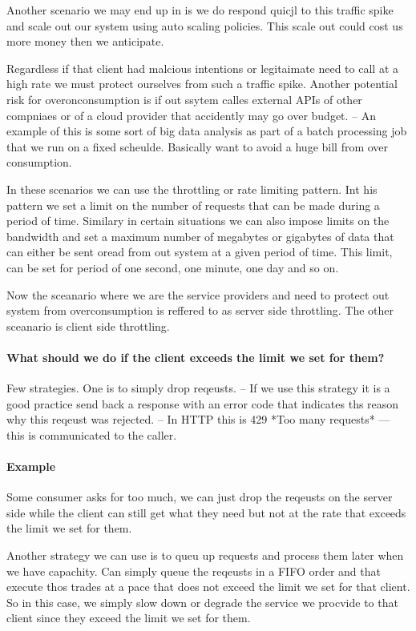 \documentclass[a4paper, 11pt]{book}
\begin{document}
    Another scenario we may end up in is we do respond quicjl to this traffic spike and scale out our system using auto scaling policies.
    This scale out could cost us more money then we anticipate.

    Regardless if that client had malcious intentions or legitaimate need to call at a high rate we must protect ourselves from such a traffic spike.
    Another potential risk for overonconsumption is if out ssytem calles external APIs of other compniaes or of a cloud provider that accidently may go over budget.
    -- An example of this is some sort of big data analysis as part of a batch processing job that we run on a fixed scheulde.
    Basically want to avoid a huge bill from over consumption.

    In these scenarios we can use the throttling or rate limiting pattern.
    Int his pattern we set a limit on the number of requests that can be made during a period of time.
    Similary in certain situations we can also impose limits on the bandwidth and set a maximum number of megabytes or gigabytes of data that can either be sent oread from out system at a given period of time.
    This limit, can be set for period of one second, one minute, one day and so on.

    Now the sceanario where we are the service providers and need to protect out system from overconsumption is reffered to as server side throttling.
    The other sceanario is client side throttling.

    \paragraph{What should we do if the client exceeds the limit we set for them?}
    Few strategies.
    One is to simply drop reqeusts.
    -- If we use this strategy it is a good practice send back a response with an error code that indicates ths reason why this reqeust was rejected.
    -- In HTTP this is 429 *Too many requests* --- this is communicated to the caller.

    \paragraph{Example}
    Some consumer asks for too much, we can just drop the reqeusts on the server side while the client can still get what they need but not at the rate that exceeds the limit we set for them.

    Another strategy we can use is to queu up requests and process them later when we have capachity.
    Can simply queue the reqeusts in a FIFO order and that execute thos trades at a pace that does not exceed the limit we set for that client.
    So in this case, we simply slow down or degrade the service we procvide to that client since they exceed the limit we set for them.
\end{document}
